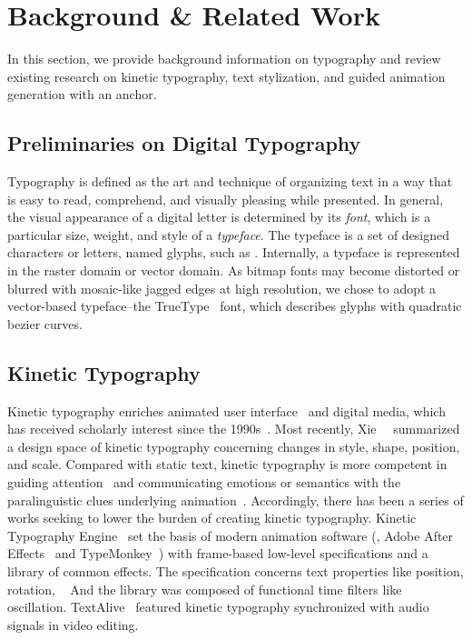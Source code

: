 \section{Background \& Related Work}
In this section, we provide background information on typography and review existing research on kinetic typography, text stylization, and guided animation generation with an anchor.

\subsection{Preliminaries on Digital Typography}
Typography is defined as the art and technique of organizing text in a way that is easy to read, comprehend, and visually pleasing while presented.
In general, the visual appearance of a digital letter is determined by its \textit{font}, which is a particular size, weight, and style of a \textit{typeface}.
The typeface is a set of designed characters or letters, named glyphs, such as .
Internally, a typeface is represented in the raster domain or vector domain.
As bitmap fonts may become distorted or blurred with mosaic-like jagged edges at high resolution, we chose to adopt a vector-based typeface--the TrueType~\cite{penney1996truetype} font, which describes glyphs with quadratic bezier curves.


\subsection{Kinetic Typography}
Kinetic typography enriches animated user interface~\cite{chang1993animation} and digital media, which has received scholarly interest since the 1990s~\cite{shannon1998kinetic}. Most recently, Xie~\ea~\cite{xie2023emordle} summarized a design space of kinetic typography concerning changes in style, shape, position, and scale.
Compared with static text, kinetic typography is more competent in guiding attention~\cite{borzyskowski2004animated, minakuchi2008kinetic} and communicating emotions or semantics with the paralinguistic clues underlying animation~\cite{malik2009communicating, Lee07EmotiveCaptioning}.
Accordingly, there has been a series of works seeking to lower the burden of creating kinetic typography.
Kinetic Typography Engine~\cite{lee2002engine} set the basis of modern animation software (\eg, Adobe After Effects~\cite{aftereffects} and TypeMonkey~\cite{typemonkey}) with frame-based low-level specifications and a library of common effects.
The specification concerns text properties like position, rotation, \etc~
And the library was composed of functional time filters like oscillation.
TextAlive~\cite{kato2015textalive} featured kinetic typography synchronized with audio signals in video editing.

